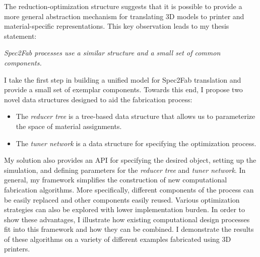 The reduction-optimization structure suggests that it is possible to provide
a more general abstraction mechanism for translating 3D models to printer and material-specific representations.
This key observation leads to my thesis statement:

\emph{Spec2Fab processes use a similar structure and a small set of common components.}

I take the first step in building a unified model for Spec2Fab translation and provide a small set of 
exemplar components.
Towards this end, I propose two novel data structures designed to aid the fabrication process:
\begin{itemize}
\item The \emph{reducer tree} is a tree-based data structure that allows us to parameterize the space of material assignments.
\item The \emph{tuner network} is a data structure for specifying the optimization process.
\end{itemize}
My solution also provides an API for specifying the desired object, setting up the simulation, and defining parameters for the \emph{reducer tree} and \emph{tuner network}.
In general, my framework simplifies the construction of new computational fabrication algorithms.
More specifically, different components of the process can be easily replaced and other components easily reused. 
Various optimization strategies can also be explored with lower implementation burden. In order to show these advantages,
I illustrate how existing computational design processes fit into this framework and how they can be combined.
I demonstrate the results of these algorithms on a variety of different examples fabricated using 3D printers.
